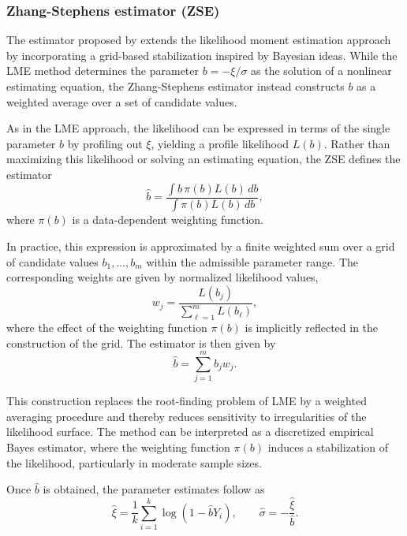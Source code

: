 \subsubsection*{Zhang-Stephens estimator (ZSE)}

The estimator proposed by \citet{zhang2009new} extends the likelihood moment estimation approach by incorporating a grid-based stabilization inspired by Bayesian ideas. While the LME method determines the parameter $b = -\xi/\sigma$ as the solution of a nonlinear estimating equation, the Zhang-Stephens estimator instead constructs $b$ as a weighted average over a set of candidate values.

As in the LME approach, the likelihood can be expressed in terms of the single parameter $b$ by profiling out $\xi$, yielding a profile likelihood $L(b)$. Rather than maximizing this likelihood or solving an estimating equation, the ZSE defines the estimator
\begin{equation}
\hat{b} = \frac{\int b \, \pi(b) L(b)\, db}{\int \pi(b) L(b)\, db},
\end{equation}
where $\pi(b)$ is a data-dependent weighting function.

In practice, this expression is approximated by a finite weighted sum over a grid of candidate values $b_1,\dots,b_m$ within the admissible parameter range. The corresponding weights are given by normalized likelihood values,
\begin{equation}
w_j = \frac{L(b_j)}{\sum_{\ell=1}^m L(b_\ell)},
\end{equation}
where the effect of the weighting function $\pi(b)$ is implicitly reflected in the construction of the grid. The estimator is then given by
\begin{equation}
\hat{b} = \sum_{j=1}^m b_j w_j.
\end{equation}

This construction replaces the root-finding problem of LME by a weighted averaging procedure and thereby reduces sensitivity to irregularities of the likelihood surface. The method can be interpreted as a discretized empirical Bayes estimator, where the weighting function $\pi(b)$ induces a stabilization of the likelihood, particularly in moderate sample sizes.

Once $\hat{b}$ is obtained, the parameter estimates follow as
\begin{equation}
\hat{\xi} = \frac{1}{k}\sum_{i=1}^k \log(1 - \hat{b}Y_i),
\qquad
\hat{\sigma} = -\frac{\hat{\xi}}{\hat{b}}.
\end{equation}

